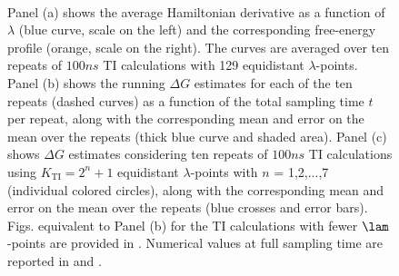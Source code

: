 \begin{figure}
  \centering
  \hfill%
  \hfill%
  \\
  \caption{\footnotesize
%
%
           Panel (a) shows the average Hamiltonian derivative as a function of 
                     $\lambda$ (blue curve, scale on the left) and the corresponding free-energy 
                     profile (orange, scale on the right). The curves are
                     averaged over ten repeats of $100\unit{ns}$ TI calculations 
                     with 129 equidistant $\lambda$-points.
           Panel (b) shows the running $\Delta G$ estimates for each of the ten repeats (dashed curves)
                     as a function of the total sampling time $t$ per repeat, 
                     along with the corresponding mean and error on the mean  over the repeats 
                     (thick blue curve and shaded area).
           Panel (c) shows $\Delta G$ estimates considering ten repeats of $100\unit{ns}$
                     TI calculations using $K_{\mathrm{TI}}=2^n+1$ equidistant
                     $\lambda$-points with $n$ = 1,2,...,7 
                     (individual colored circles),
                     along with the corresponding mean and error on the mean  over the repeats 
                     (blue crosses and error bars).
%
%
           Figs. equivalent to Panel (b) for the TI calculations
           with fewer $\lam$-points are provided in .
%
           Numerical values at full sampling time are reported in 
           and .
          }
  \label{fig:ti}
\end{figure}


